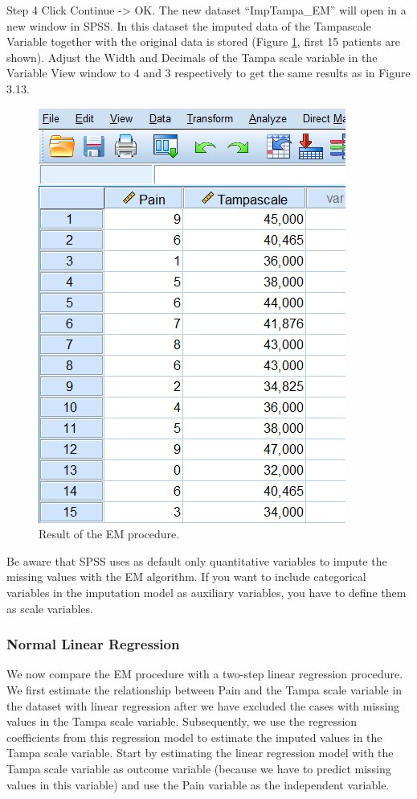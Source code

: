 \documentclass[]{book}
\theoremstyle{definition}
\theoremstyle{definition}
\theoremstyle{definition}
\theoremstyle{remark}
\begin{document}
Step 4 Click Continue -\textgreater{} OK. The new dataset
``ImpTampa\_EM'' will open in a new window in SPSS. In this dataset the
imputed data of the Tampascale Variable together with the original data
is stored (Figure \ref{fig:fig3-13}, first 15 patients are shown).
Adjust the Width and Decimals of the Tampa scale variable in the
Variable View window to 4 and 3 respectively to get the same results as
in Figure 3.13.

\begin{figure}

{\centering \includegraphics[width=0.7\linewidth]{images/fig3.13} 

}

\caption{Result of the EM procedure.}\label{fig:fig3-13}
\end{figure}

Be aware that SPSS uses as default only quantitative variables to impute
the missing values with the EM algorithm. If you want to include
categorical variables in the imputation model as auxiliary variables,
you have to define them as scale variables.

\subsubsection{Normal Linear Regression}\label{normal-linear-regression}

We now compare the EM procedure with a two-step linear regression
procedure. We first estimate the relationship between Pain and the Tampa
scale variable in the dataset with linear regression after we have
excluded the cases with missing values in the Tampa scale variable.
Subsequently, we use the regression coefficients from this regression
model to estimate the imputed values in the Tampa scale variable. Start
by estimating the linear regression model with the Tampa scale variable
as outcome variable (because we have to predict missing values in this
variable) and use the Pain variable as the independent variable.
\end{document}
